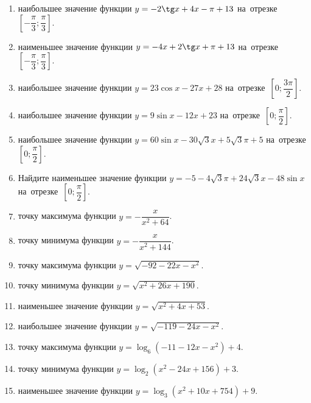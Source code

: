 \documentclass[a4paper,10pt]{article}
\begin{document}
\begin{enumerate}
\item {} наибольшее значение функции $y=-2\tg x +4x-\pi +13$ на~отрезке~$\left[-\dfrac{\pi}{3};\dfrac{\pi}{3}\right]$.

\item {} наименьшее значение функции $y=-4x +2\tg x+\pi+13$ на~отрезке~$\left[-\dfrac{\pi}{3};\dfrac{\pi}{3}\right]$.

\item {} наибольшее значение функции $y=23\cos x-27x+28$ на~отрезке~$\left[0;\dfrac{3\pi}{2}\right]$.

\item {} наибольшее значение функции $y=9\sin x-12x+23$ на~отрезке~$\left[0;\dfrac{\pi}{2}\right]$.

\item {} наибольшее значение функции $y=60\sin x-30\sqrt{3}x+5\sqrt{3}\pi +5$ на~отрезке~$\left[0;\dfrac{\pi}{2}\right]$.

\item Найдите наименьшее значение функции $y=-5-4\sqrt{3}\pi+24\sqrt{3}x-48\sin x$ на~отрезке~$\left[0;\dfrac{\pi}{2}\right]$.

\item {} точку максимума функции $y=-\dfrac{x}{ x^2 +64}$.

\item {} точку минимума функции $y=-\dfrac{x}{ x^2 +144}$.

\item {} точку максимума функции $y=\sqrt{-92-22x-x^2}$.

\item {} точку минимума функции $y=\sqrt{x^2+26x+190}$.

\item {} наименьшее значение функции $y=\sqrt{x^2+4x+53}$.

\item {} наибольшее значение функции $y=\sqrt{-119-24x-x^2}$.

\item {} точку максимума функции $y=\log_6\left(-11-12x-x^2\right)+4$.

\item {} точку минимума функции $y=\log_2\left(x^2-24x+156\right)+3$.

\item {} наименьшее значение функции $y=\log_3\left(x^2+10x+754\right)+9$.


\end{enumerate}
\end{document}
